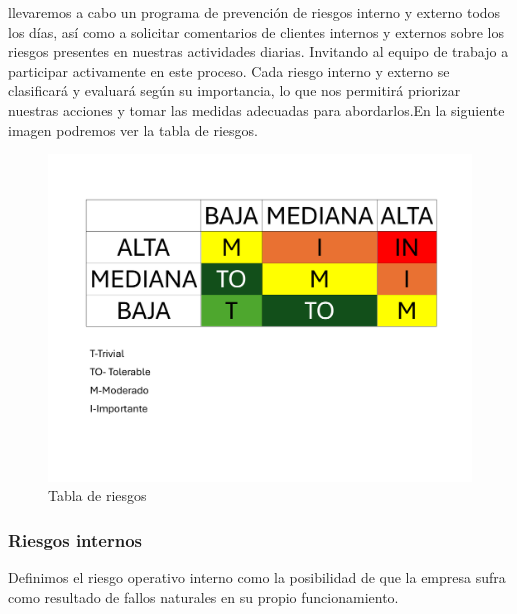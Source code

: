     llevaremos a cabo un programa de prevención de riesgos interno y externo todos los días, así como a solicitar comentarios de clientes internos y externos sobre los riesgos presentes en nuestras actividades diarias. Invitando al equipo de trabajo a participar activamente en este proceso.
    Cada riesgo interno y externo se clasificará y evaluará según su importancia, lo que nos permitirá priorizar nuestras acciones y tomar las medidas adecuadas para abordarlos.En la siguiente imagen podremos ver la tabla de riesgos.
    \begin{figure}[H]
        \centering
        \includegraphics[scale=0.3]{13/img/EvaluacionRiesgo.pdf}
        \caption{Tabla de riesgos}
    \end{figure}
    \subsubsection{Riesgos internos}
    
    Definimos el riesgo operativo interno como la posibilidad de que la empresa sufra como resultado de fallos naturales en su propio funcionamiento.
    
